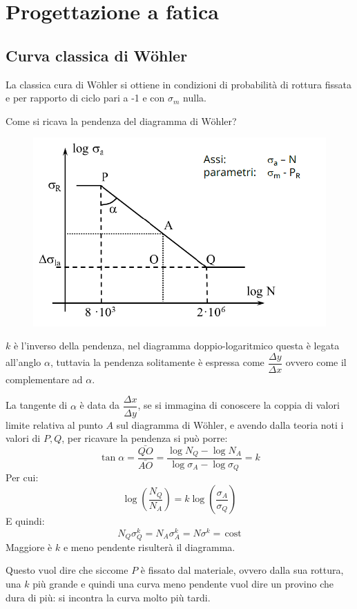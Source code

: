 
	
\section{Progettazione a fatica}
\subsection{Curva classica di Wöhler}
			La classica cura di Wöhler si ottiene in condizioni di probabilità di rottura fissata e per rapporto di ciclo pari a -1 e con $\sigma_m$ nulla. \newline
			
			Come si ricava la pendenza del diagramma di Wöhler? 
\begin{figure}[H]
	\centering
	\label{fig:screenshot002}
	\includegraphics[width=0.5\linewidth]{immagini_11/screenshot002}
\end{figure}
			$k$ è l'inverso della pendenza, nel diagramma doppio-logaritmico questa è legata all'anglo $\alpha$, tuttavia la pendenza solitamente è espressa come $\dfrac{\Delta y}{\Delta x}$ ovvero come il complementare ad $\alpha$. 
			
			La tangente di $\alpha$ è data da $\dfrac{\Delta x}{\Delta y}$, se si immagina di conoscere la coppia di valori limite relativa al punto $A$ sul diagramma di Wöhler, e avendo dalla teoria noti i valori di $P, Q$, per ricavare la pendenza si può porre:
			\[\tan\alpha = \dfrac{\bar{QO}}{\bar{AO}} = \dfrac{\log N_Q - \log N_A}{\log\sigma_A - \log\sigma_Q} = k\]
			Per cui:
			\[\log\left(\dfrac{N_Q}{N_A}\right) = k\log\left(\dfrac{\sigma_A}{\sigma_Q}\right)\]
			E quindi:
			\[N_Q\sigma_Q^k = N_A\sigma_A^k = N\sigma^k = \, \text{cost}\]
			Maggiore è $k$ e meno pendente risulterà il diagramma. \newline 
			
			Questo vuol dire che siccome $P$ è fissato dal materiale, ovvero dalla sua rottura, una $k$ più grande e quindi una curva meno pendente vuol dire un provino che dura di più: si incontra la curva molto più tardi. \newline 
			
